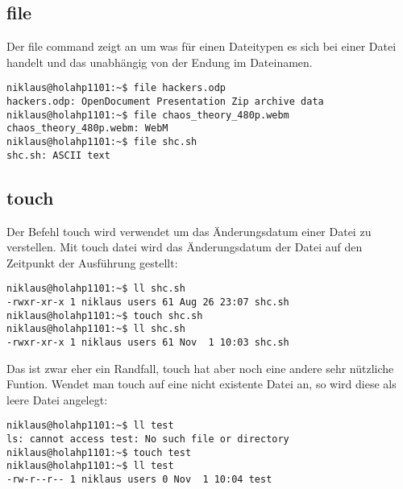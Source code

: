 \subsection{file}
Der file command zeigt an um was f\"ur einen Dateitypen es sich bei einer Datei handelt und das unabh\"angig von der Endung im Dateinamen.
\begin{lstlisting}[frame=single]
niklaus@holahp1101:~$ file hackers.odp 
hackers.odp: OpenDocument Presentation Zip archive data
niklaus@holahp1101:~$ file chaos_theory_480p.webm 
chaos_theory_480p.webm: WebM
niklaus@holahp1101:~$ file shc.sh 
shc.sh: ASCII text
\end{lstlisting}
\subsection{touch}
Der Befehl touch wird verwendet um das \"Anderungsdatum einer Datei zu verstellen. Mit touch datei wird das \"Anderungsdatum der Datei auf den Zeitpunkt der Ausf\"uhrung gestellt:
\begin{lstlisting}[frame=single]
niklaus@holahp1101:~$ ll shc.sh 
-rwxr-xr-x 1 niklaus users 61 Aug 26 23:07 shc.sh
niklaus@holahp1101:~$ touch shc.sh 
niklaus@holahp1101:~$ ll shc.sh 
-rwxr-xr-x 1 niklaus users 61 Nov  1 10:03 shc.sh
\end{lstlisting}
Das ist zwar eher ein Randfall, touch hat aber noch eine andere sehr n\"utzliche Funtion. Wendet man touch auf eine nicht existente Datei an, so wird diese als leere Datei angelegt:
\begin{lstlisting}[frame=single]
niklaus@holahp1101:~$ ll test
ls: cannot access test: No such file or directory
niklaus@holahp1101:~$ touch test
niklaus@holahp1101:~$ ll test
-rw-r--r-- 1 niklaus users 0 Nov  1 10:04 test
\end{lstlisting}
